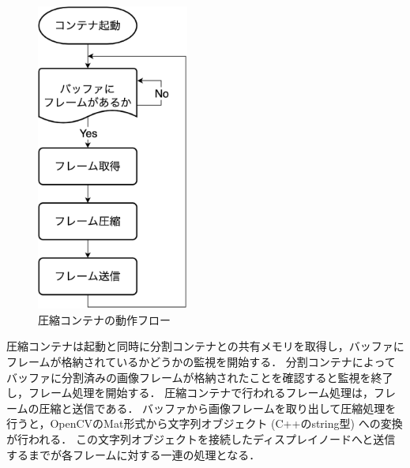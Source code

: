 \begin{figure}[H]
    \hspace*{\fill}
    \includegraphics[width=50mm]{./fig/chap3/assyuku_flow.eps}
    \hspace*{\fill}
    \caption{圧縮コンテナの動作フロー}
    \label{compress_container}
\end{figure}

圧縮コンテナは起動と同時に分割コンテナとの共有メモリを取得し，バッファにフレームが格納されているかどうかの監視を開始する．
分割コンテナによってバッファに分割済みの画像フレームが格納されたことを確認すると監視を終了し，フレーム処理を開始する．
圧縮コンテナで行われるフレーム処理は，フレームの圧縮と送信である．
バッファから画像フレームを取り出して圧縮処理を行うと，OpenCVのMat形式から文字列オブジェクト (C++のstring型) への変換が行われる．
この文字列オブジェクトを接続したディスプレイノードへと送信するまでが各フレームに対する一連の処理となる．

